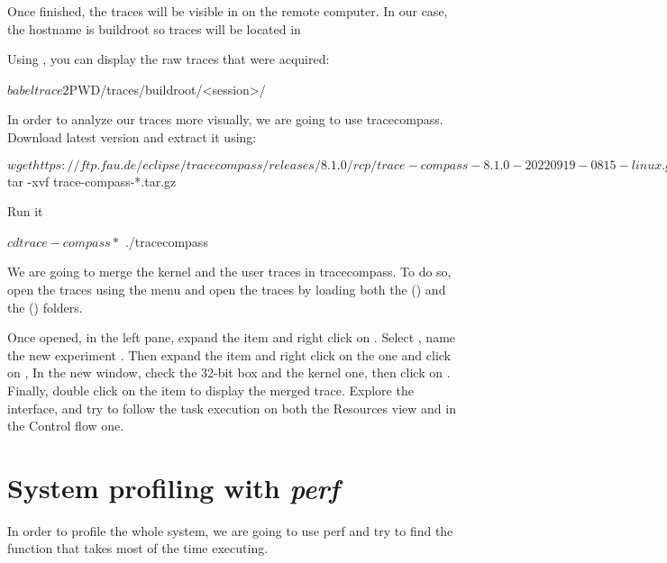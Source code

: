 Once finished, the traces will be visible in 
on the remote computer. In our case, the hostname is buildroot so traces will be
located in 

Using , you can display the raw traces that were acquired:
\begin{bashinput}
$ babeltrace2 $PWD/traces/buildroot/<session>/
\end{bashinput}

In order to analyze our traces more visually, we are going to use tracecompass.
Download  latest version and extract it using:

\begin{bashinput}
$ wget https://ftp.fau.de/eclipse/tracecompass/releases/8.1.0/rcp/trace-compass-8.1.0-20220919-0815-linux.gtk.x86_64.tar.gz
$ tar -xvf trace-compass-*.tar.gz
\end{bashinput}

Run it
\begin{bashinput}
$ cd trace-compass*
$ ./tracecompass
\end{bashinput}

We are going to merge the kernel and the user traces in tracecompass. To do so,
open the traces using the  menu and open the traces
by loading both the  () and the 
() folders.

Once opened, in the left pane, expand the  item and right click
on . Select , name the new experiment
. Then expand the  item and right click on
the  one and click on , In the new
window, check the 32-bit box and the kernel one, then click on .
Finally, double click on the  item to display the merged
trace. Explore the interface, and try to follow the task execution on both the
Resources view and in the Control flow one.

\section{System profiling with {\em perf}}

In order to profile the whole system, we are going to use perf and try to find
the function that takes most of the time executing.

